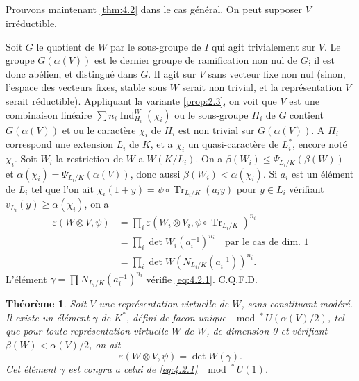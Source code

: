 \documentclass[12pt,a4paper]{article}
\theoremstyle{plain}
\newtheorem{theorem}{Th\'eor\`eme}[section]
\theoremstyle{definition}
\theoremstyle{remark}
\DeclareMathOperator{\Ind}{Ind}
\DeclareMathOperator{\Tr}{Tr}
\providecommand{\Tr}{\operatorname{Tr}}
\begin{document}
\subsection{}
\label{sec:4.5}

Prouvons maintenant \ref{thm:4.2} dans le cas g\'en\'eral. On peut supposer $V$ irr\'eductible.

Soit $G$ le quotient de $W$ par le sous-groupe de $I$ qui agit trivialement sur $V$. Le groupe $G(\alpha(V))$ est le dernier groupe de ramification non nul de $G$; il est donc ab\'elien, et distingu\'e dans $G$. Il agit sur $V$ sans vecteur fixe non nul (sinon, l'espace des vecteurs fixes, stable sous $W$ serait non trivial, et la repr\'esentation $V$ serait r\'eductible). Appliquant la variante \ref{prop:2.3}, on voit que $V$ est une combinaison lin\'eaire $\sum n_i \Ind_{H_i}^W(\chi_i)$ ou le sous-groupe $H_i$ de $G$ contient $G(\alpha(V))$ et ou le caract\`ere $\chi_i$ de $H_i$ est non trivial sur $G(\alpha(V))$. A $H_i$ correspond une extension $L_i$ de $K$, et a $\chi_i$ un quasi-caract\`ere de $L_i^*$, encore not\'e $\chi_i$. Soit $W_i$ la restriction de $W$ a $W(K/L_i)$. On a $\beta(W_i) \leq \Psi_{L_i/K}(\beta(W))$ et $\alpha(\chi_i) = \Psi_{L_i/K}(\alpha(V))$, donc aussi $\beta(W_i) < \alpha(\chi_i)$. Si $a_i$ est un \'el\'ement de $L_i$ tel que l'on ait $\chi_i(1+y) = \psi \circ \Tr_{L_i/K}(a_i y)$ pour $y \in L_i$ v\'erifiant $v_{L_i}(y) \geq \alpha(\chi_i)$, on a
\begin{align*}
\varepsilon(W \otimes V, \psi) &= \prod_i \varepsilon(W_i \otimes V_i, \psi \circ \Tr_{L_i/K})^{n_i} \\
&= \prod_i \det W_i(a_i^{-1})^{n_i} \quad \text{par le cas de dim.~1} \\
&= \prod_i \det W(N_{L_i/K}(a_i^{-1}))^{n_i}.
\end{align*}
L'\'el\'ement $\gamma = \prod N_{L_i/K}(a_i^{-1})^{n_i}$ v\'erifie \eqref{eq:4.2.1}. C.Q.F.D.

\begin{theorem}\label{thm:4.6}
Soit $V$ une repr\'esentation virtuelle de $W$, sans constituant mod\'er\'e. Il existe un \'el\'ement $\gamma$ de $K^*$, d\'efini de facon unique $\mod^*\, U(\alpha(V)/2)$, tel que pour toute repr\'esentation virtuelle $W$ de $W$, de dimension 0 et v\'erifiant $\beta(W) < \alpha(V)/2$, on ait
\begin{equation}\label{eq:4.6.1}
\varepsilon(W \otimes V, \psi) = \det W(\gamma).
\end{equation}
Cet \'el\'ement $\gamma$ est congru a celui de \eqref{eq:4.2.1} $\mod^*\, U(1)$.
\end{theorem}
\end{document}
